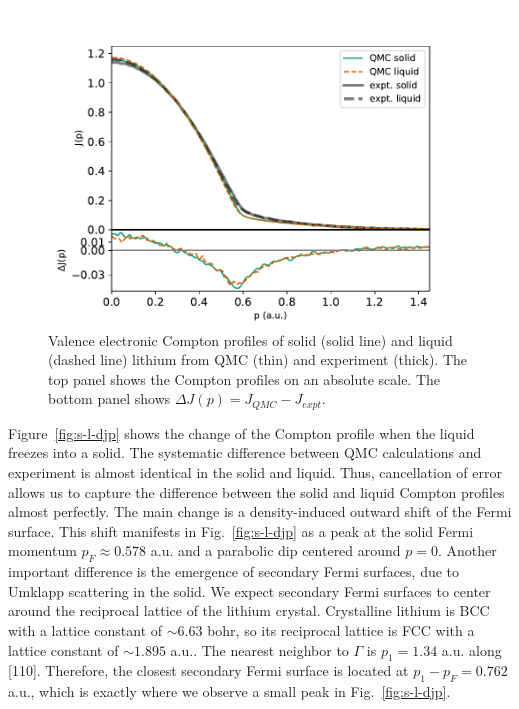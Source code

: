 \documentclass[aps,prb,showpacs,preprintnumbers,amsmath,amssymb,superscriptaddress,twocolumn]{revtex4-1}
\begin{document}
\begin{figure}[h]
\includegraphics[width=\linewidth]{li58_sl-jp}
\caption{Valence electronic Compton profiles of solid (solid line) and liquid (dashed line) lithium from QMC (thin) and experiment (thick). The top panel shows the Compton profiles on an absolute scale. The bottom panel shows  $\Delta J(p)=J_{QMC}-J_{expt}$.}%
\label{fig:sl-jp-djp}
\end{figure}

Figure~\ref{fig:s-l-djp} shows the change of the Compton profile when the liquid freezes into a solid. The systematic difference  between QMC calculations and experiment is almost identical in the solid and liquid. Thus, cancellation of error allows us to capture the difference between the solid and liquid Compton profiles almost perfectly.
The main change is a density-induced outward shift of the Fermi surface. This shift manifests in Fig.~\ref{fig:s-l-djp} as a peak at the solid Fermi momentum $p_F\approx0.578$ a.u. and a parabolic dip centered around $p=0$. Another important difference is the emergence of secondary Fermi surfaces, due to Umklapp scattering in the solid. We expect secondary Fermi surfaces to center around the reciprocal lattice of the lithium crystal. Crystalline lithium is BCC with a lattice constant of $\sim 6.63$ bohr, so its reciprocal lattice is FCC with a lattice constant of $\sim 1.895$ a.u.. The nearest neighbor to $\Gamma$ is $p_1=1.34$ a.u.  along [110]. Therefore, the closest secondary Fermi surface is located at $p_1-p_F=0.762$ a.u., which is exactly where we observe a small peak in Fig.~\ref{fig:s-l-djp}.
\end{document}
